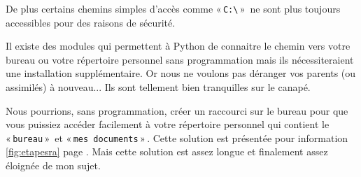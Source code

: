 De plus certains chemins simples d'accès comme « \Verb+C:\+ »  ne sont plus toujours accessibles pour des raisons de sécurité.

Il existe des modules qui permettent à Python de connaitre le chemin vers votre bureau ou votre répertoire personnel sans programmation mais ils nécessiteraient une installation supplémentaire. Or nous ne voulons pas déranger vos parents (ou assimilés) à nouveau... Ils sont tellement bien tranquilles sur le canapé.

Nous pourrions, sans programmation, créer un raccourci sur le bureau pour que vous puissiez accéder facilement à votre répertoire personnel qui contient le « \texttt{bureau} »   et « \texttt{mes documents} » . Cette solution est présentée pour information \autoref{fig:etapesra} page \pageref{fig:etapesra}. Mais cette solution est assez longue et finalement assez éloignée de mon sujet.


